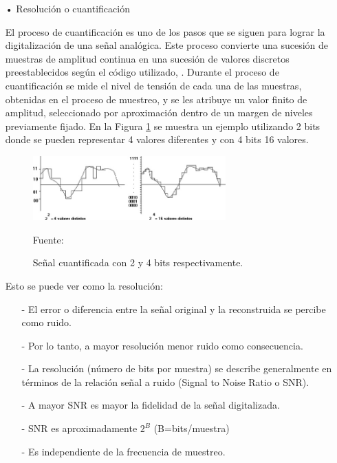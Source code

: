 \begin{enumerate}
\begin{enumerate}
\item[•]Resolución o cuantificación
\par
El proceso de cuantificación es uno de los pasos que se siguen para lograr la digitalización de una señal analógica. Este proceso convierte una sucesión de muestras de amplitud continua en una sucesión de valores discretos preestablecidos según el código utilizado, \cite{manfred}.
\vskip 0.5cm
Durante el proceso de cuantificación se mide el nivel de tensión de cada una de las muestras, obtenidas en el proceso de muestreo, y se les atribuye un valor finito de amplitud, seleccionado por aproximación dentro de un margen de niveles previamente fijado.
\vskip 0.5cm
En la Figura \ref{fig:figura2.11} se muestra un ejemplo utilizando 2 bits donde se pueden representar 4 valores diferentes y con 4 bits 16 valores.
\vskip 0.5cm
\begin{figure}[ht]
\begin{center}
\includegraphics[width=0.7\textwidth]{Imagenes/Cap2/image011}
\end{center}
\begin{center}
\vskip -0.5cm
\caption{\small{Señal cuantificada con 2 y 4 bits respectivamente.}}
\label{fig:figura2.11}
{\small{Fuente: \cite{eyra}}}
\end{center}
\end{figure}

Esto se puede ver como la resolución:
\begin{enumerate}
\item[-]El error o diferencia entre la señal original y la reconstruida se percibe como ruido.
\item[-]Por lo tanto, a mayor resolución menor ruido como consecuencia.
\item[-]La resolución (número de bits por muestra) se describe generalmente en términos de la relación señal a ruido (Signal to Noise Ratio o SNR).
\item[-]A mayor SNR es mayor la fidelidad de la señal digitalizada.
\item[-]SNR es aproximadamente $2^B$ (B=bits/muestra)
\item[-]Es independiente de la frecuencia de muestreo.
\end{enumerate}


\end{enumerate}
\end{enumerate}
